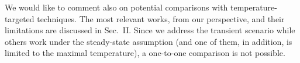 \begin{authors}
We would like to comment also on potential comparisons with temperature-targeted techniques.
The most relevant works, from our perspective, and their limitations are discussed in Sec.~II.
Since we address the transient scenario while others work under the steady-state assumption (and one of them, in addition, is limited to the maximal temperature), a one-to-one comparison is not possible.

\begin{actions}
\end{actions}
\end{authors}
